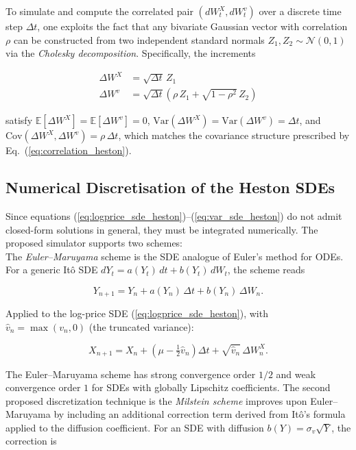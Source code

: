 To simulate and compute the correlated pair $(dW_t^X, dW_t^v)$ over a discrete time step $\Delta t$, one exploits the fact that any bivariate Gaussian vector with correlation $\rho$ can be constructed from two independent standard normals $Z_1, Z_2 \sim \mathcal{N}(0,1)$ via the \textit{Cholesky decomposition}. Specifically, the increments

\begin{align}
    \Delta W^X &= \sqrt{\Delta t}\, Z_1 \label{eq:dWX}\\
    \Delta W^v &= \sqrt{\Delta t}\left(\rho\, Z_1 + \sqrt{1-\rho^2}\, Z_2\right) \label{eq:dWv}
\end{align}

satisfy $\mathbb{E}[\Delta W^X] = \mathbb{E}[\Delta W^v] = 0$, $\text{Var}(\Delta W^X) = \text{Var}(\Delta W^v) = \Delta t$, and $\text{Cov}(\Delta W^X, \Delta W^v) = \rho\,\Delta t$, which matches the covariance structure prescribed by Eq.~(\ref{eq:correlation_heston}). 
\subsection{Numerical Discretisation of the Heston SDEs}
\label{sec:discretisation}

Since equations (\ref{eq:logprice_sde_heston})--(\ref{eq:var_sde_heston}) do not admit closed-form solutions in general, they must be integrated numerically. The proposed simulator supports two schemes:\\
The \textit{Euler--Maruyama} scheme \cite{heston:euler_maruyama} is the SDE analogue of Euler's method for ODEs. For a generic It\^{o} SDE $dY_t = a(Y_t)\,dt + b(Y_t)\,dW_t$, the scheme reads

\begin{equation}
    Y_{n+1} = Y_n + a(Y_n)\,\Delta t + b(Y_n)\,\Delta W_n.
    \label{eq:euler}
\end{equation}

Applied to the log-price SDE (\ref{eq:logprice_sde_heston}), with $\hat{v}_n = \max(v_n, 0)$ (the truncated variance):

\begin{equation}
    X_{n+1} = X_n + \left(\mu - \tfrac{1}{2}\hat{v}_n\right)\Delta t + \sqrt{\hat{v}_n}\,\Delta W_n^X.
    \label{eq:euler_logprice}
\end{equation}

The Euler--Maruyama scheme has strong convergence order $1/2$ and weak convergence order $1$ for SDEs with globally Lipschitz coefficients.
The second proposed discretization technique is the \textit{Milstein scheme} \cite{heston:milstein} improves upon Euler--Maruyama by including an additional correction term derived from It\^{o}'s formula applied to the diffusion coefficient. For an SDE with diffusion $b(Y) = \sigma_v\sqrt{Y}$, the correction is

